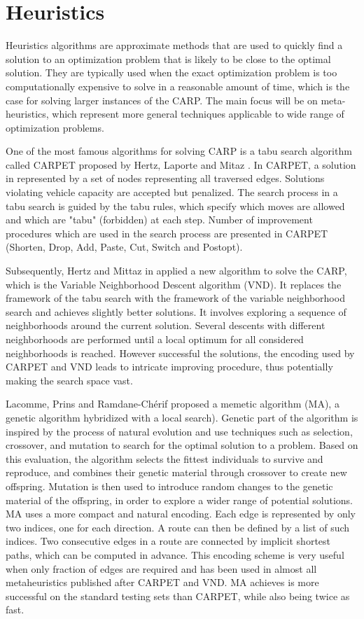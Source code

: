 \documentclass[twoside]{ctuthesis}
\theoremstyle{plain}
\theoremstyle{definition}
\theoremstyle{note}
\begin{document}
\section{Heuristics}
Heuristics algorithms are approximate methods that are used to quickly find a solution to an optimization problem that is likely to be close to the optimal solution. They are typically used when the exact optimization problem is too computationally expensive to solve in a reasonable amount of time, which is the case for solving larger instances of the CARP. The main focus will be on meta-heuristics, which represent more general techniques applicable to wide range of optimization problems.

One of the most famous algorithms for solving CARP is a tabu search algorithm called CARPET proposed by Hertz, Laporte and Mitaz \cite{hertz2000tabu}. In CARPET, a solution in represented by a set of nodes representing all traversed edges. Solutions violating vehicle capacity are accepted but penalized. The search process in a tabu search is guided by the tabu rules, which specify which moves are allowed and which are "tabu" (forbidden) at each step. Number of improvement procedures which are used in the search process are presented in CARPET (Shorten, Drop, Add, Paste, Cut, Switch and Postopt).

Subsequently, Hertz and Mittaz in \cite{hertz2001variable} applied a new algorithm to solve the CARP, which is the Variable Neighborhood Descent algorithm (VND). It replaces the framework of the tabu search with the framework of the variable neighborhood search and achieves slightly better solutions. It involves exploring a sequence of neighborhoods around the current solution. Several descents with different neighborhoods are performed until a local optimum for all considered neighborhoods is reached. However successful the solutions, the encoding used by CARPET and VND leads to intricate improving procedure, thus potentially making the search space vast.

Lacomme, Prins and Ramdane-Ch{\'e}rif \cite{lacomme2001genetic} proposed a memetic algorithm (MA), a genetic algorithm hybridized with a local search). Genetic part of the algorithm is inspired by the process of natural evolution and use techniques such as selection, crossover, and mutation to search for the optimal solution to a problem. Based on this evaluation, the algorithm selects the fittest individuals to survive and reproduce, and combines their genetic material through crossover to create new offspring. Mutation is then used to introduce random changes to the genetic material of the offspring, in order to explore a wider range of potential solutions. MA uses a more compact and natural encoding. Each edge is represented by only two indices, one for each direction. A route can then be defined by a list of such indices. Two consecutive edges in a route are connected by implicit shortest paths, which can be computed in advance. This encoding scheme is very useful when only fraction of edges are required and has been used in almost all metaheuristics published after CARPET and VND. MA achieves is more successful on the standard testing sets than CARPET, while also being twice as fast.
\end{document}
